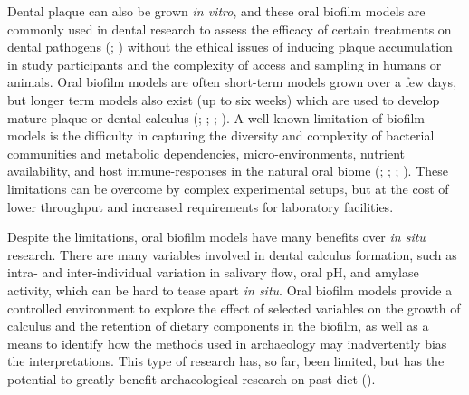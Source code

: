 \documentclass[
  b5paper,
]{book}
\begin{document}
Dental plaque can also be grown \emph{in vitro}, and these oral biofilm
models are commonly used in dental research to assess the efficacy of
certain treatments on dental pathogens
(;
) without
the ethical issues of inducing plaque accumulation in study participants
and the complexity of access and sampling in humans or animals. Oral
biofilm models are often short-term models grown over a few days, but
longer term models also exist (up to six weeks) which are used to
develop mature plaque or dental calculus
(;
;
; ). A
well-known limitation of biofilm models is the difficulty in capturing
the diversity and complexity of bacterial communities and metabolic
dependencies, micro-environments, nutrient availability, and host
immune-responses in the natural oral biome
(;
;
; ). These limitations can be overcome by complex
experimental setups, but at the cost of lower throughput and increased
requirements for laboratory facilities.

Despite the limitations, oral biofilm models have many benefits over
\emph{in situ} research. There are many variables involved in dental
calculus formation, such as intra- and inter-individual variation in
salivary flow, oral pH, and amylase activity, which can be hard to tease
apart \emph{in situ}. Oral biofilm models provide a controlled
environment to explore the effect of selected variables on the growth of
calculus and the retention of dietary components in the biofilm, as well
as a means to identify how the methods used in archaeology may
inadvertently bias the interpretations. This type of research has, so
far, been limited, but has the potential to greatly benefit
archaeological research on past diet
().
\end{document}
